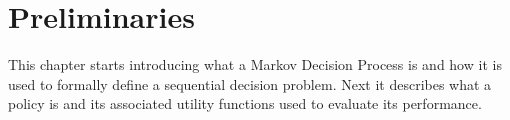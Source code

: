 \chapter{Preliminaries}
\label{ch:Preliminaries}

This chapter starts introducing what a Markov Decision Process is and how it is used to formally define a sequential decision problem.
Next it describes what a policy is and its associated utility functions used to evaluate its performance.




